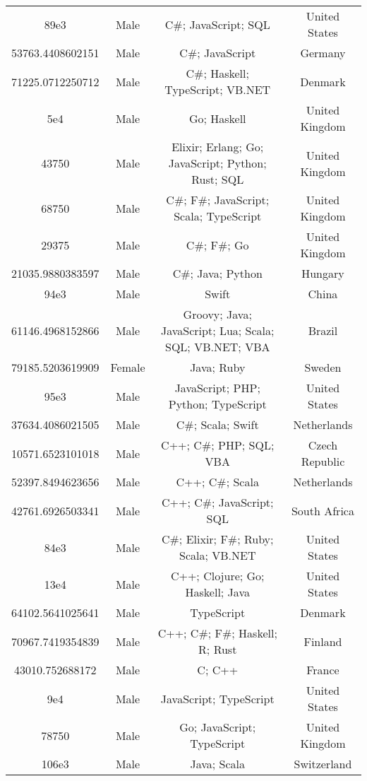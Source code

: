 \begin{center}
\begin{tabular}{ |c|c|c|c| }
89e3  &  Male  &  C\#; JavaScript; SQL  &  United States  \\ 
53763.4408602151  &  Male  &  C\#; JavaScript  &  Germany  \\ 
71225.0712250712  &  Male  &  C\#; Haskell; TypeScript; VB.NET  &  Denmark  \\ 
5e4  &  Male  &  Go; Haskell  &  United Kingdom  \\ 
43750  &  Male  &  Elixir; Erlang; Go; JavaScript; Python; Rust; SQL  &  United Kingdom  \\ 
68750  &  Male  &  C\#; F\#; JavaScript; Scala; TypeScript  &  United Kingdom  \\ 
29375  &  Male  &  C\#; F\#; Go  &  United Kingdom  \\ 
21035.9880383597  &  Male  &  C\#; Java; Python  &  Hungary  \\ 
94e3  &  Male  &  Swift  &  China  \\ 
61146.4968152866  &  Male  &  Groovy; Java; JavaScript; Lua; Scala; SQL; VB.NET; VBA  &  Brazil  \\ 
79185.5203619909  &  Female  &  Java; Ruby  &  Sweden  \\ 
95e3  &  Male  &  JavaScript; PHP; Python; TypeScript  &  United States  \\ 
37634.4086021505  &  Male  &  C\#; Scala; Swift  &  Netherlands  \\ 
10571.6523101018  &  Male  &  C++; C\#; PHP; SQL; VBA  &  Czech Republic  \\ 
52397.8494623656  &  Male  &  C++; C\#; Scala  &  Netherlands  \\ 
42761.6926503341  &  Male  &  C++; C\#; JavaScript; SQL  &  South Africa  \\ 
84e3  &  Male  &  C\#; Elixir; F\#; Ruby; Scala; VB.NET  &  United States  \\ 
13e4  &  Male  &  C++; Clojure; Go; Haskell; Java  &  United States  \\ 
64102.5641025641  &  Male  &  TypeScript  &  Denmark  \\ 
70967.7419354839  &  Male  &  C++; C\#; F\#; Haskell; R; Rust  &  Finland  \\ 
43010.752688172  &  Male  &  C; C++  &  France  \\ 
9e4  &  Male  &  JavaScript; TypeScript  &  United States  \\ 
78750  &  Male  &  Go; JavaScript; TypeScript  &  United Kingdom  \\ 
106e3  &  Male  &  Java; Scala  &  Switzerland  \\ 

\end{tabular}
\end{center}
